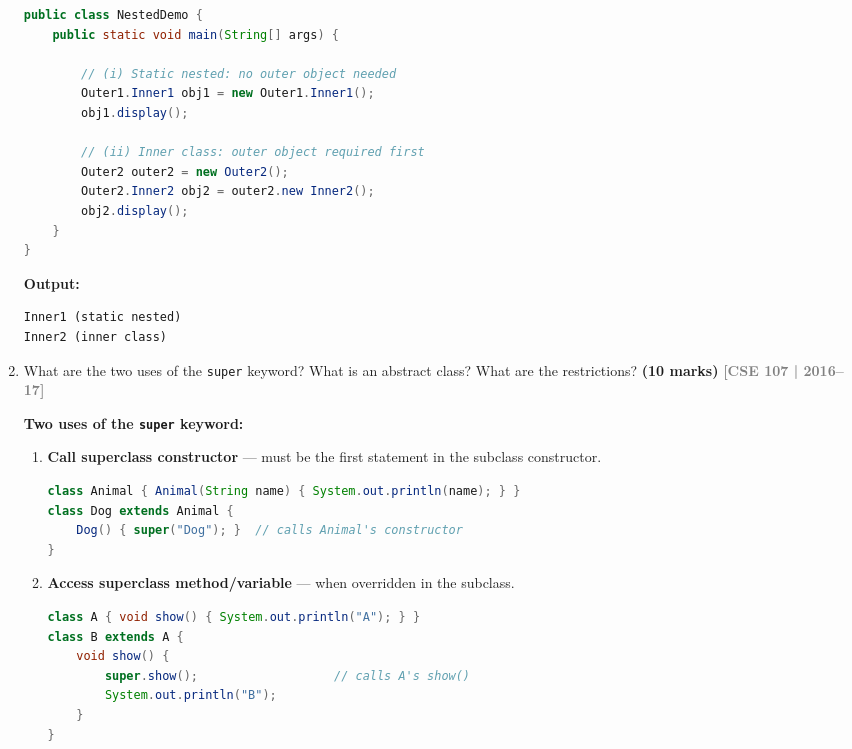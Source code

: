 \documentclass[12pt,a3paper]{article}
\newcommand{\yr}[1]{\hfill\textcolor{gray}{\small\textbf{[#1]}}}
\newcommand{\mk}[1]{\textcolor{orange!70!black}{\small\textbf{(#1 marks)}}}
\begin{document}
\begin{enumerate}
\begin{tcolorbox}
\begin{lstlisting}[language=Java]
public class NestedDemo {
    public static void main(String[] args) {

        // (i) Static nested: no outer object needed
        Outer1.Inner1 obj1 = new Outer1.Inner1();
        obj1.display();

        // (ii) Inner class: outer object required first
        Outer2 outer2 = new Outer2();
        Outer2.Inner2 obj2 = outer2.new Inner2();
        obj2.display();
    }
}
\end{lstlisting}

\textbf{Output:}
\begin{lstlisting}
Inner1 (static nested)
Inner2 (inner class)
\end{lstlisting}

\end{tcolorbox}

\item What are the two uses of the \texttt{super} keyword? What is an abstract class? What are the restrictions? \mk{10}
\yr{CSE 107 | 2016--17}

\begin{tcolorbox}[enhanced,breakable,ansbox,
  colback=cD!4,colframe=cD,boxrule=0.8pt,arc=5pt,
  title={\textbf{Answer --- Two Uses of \texttt{super} \& Abstract Class}},
  fonttitle=\bfseries\color{white},colbacktitle=cD]

\textbf{Two uses of the \texttt{super} keyword:}

\begin{enumerate}[label=\textbf{\arabic*.}]
  \item \textbf{Call superclass constructor} --- must be the first
    statement in the subclass constructor.
\begin{lstlisting}[language=Java]
class Animal { Animal(String name) { System.out.println(name); } }
class Dog extends Animal {
    Dog() { super("Dog"); }  // calls Animal's constructor
}
\end{lstlisting}

  \item \textbf{Access superclass method/variable} --- when overridden
    in the subclass.
\begin{lstlisting}[language=Java]
class A { void show() { System.out.println("A"); } }
class B extends A {
    void show() {
        super.show();                   // calls A's show()
        System.out.println("B");
    }
}
\end{lstlisting}
\end{enumerate}


\end{tcolorbox}
\end{enumerate}
\end{document}
